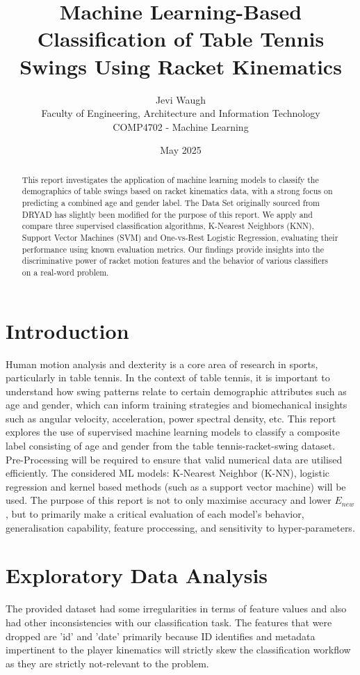 \documentclass[10pt,twocolumn]{article}
\title{\textbf{Machine Learning-Based Classification of Table Tennis Swings Using Racket Kinematics}}
\author{Jevi Waugh \\
Faculty of Engineering, Architecture and Information Technology \\
COMP4702 - Machine Learning}
\date{May 2025}
\begin{document}
\maketitle

\begin{abstract}
This report investigates the application of machine learning models to classify the demographics of table swings based on racket kinematics data, with a strong focus on predicting a combined age and gender label. The Data Set originally sourced from DRYAD has slightly been modified for the purpose of this report. We apply and compare three supervised classification algorithms, K-Nearest Neighbors (KNN), Support Vector Machines (SVM) and One-vs-Rest Logistic Regression, evaluating their performance using known evaluation metrics. Our findings provide insights into the discriminative power of racket motion features and the behavior of various classifiers on a real-word problem.
\end{abstract}

\section{Introduction}
Human motion analysis and dexterity is a core area of research in sports, particularly in table tennis. In the context of table tennis, it is important to understand how swing patterns relate to certain demographic attributes such as age and gender, which can inform training strategies and biomechanical insights such as angular velocity, acceleration, power spectral density, etc. This report explores the use of supervised machine learning models to classify a composite label consisting of age and gender from the table tennis-racket-swing dataset. Pre-Processing will be required to ensure that valid numerical data are utilised efficiently. The considered ML models: K-Nearest Neighbor (K-NN), logistic regression and kernel based methods (such as a support vector machine) will be used. The purpose of this report is not to only maximise accuracy and lower $E_{new}$, but to primarily make a critical evaluation of each model's behavior, generalisation capability, feature proccessing, and sensitivity to hyper-parameters.

\section{Exploratory Data Analysis}
The provided dataset had some irregularities in terms of feature values and also had other inconsistencies with our classification task. The features that were dropped are 'id' and 'date' primarily because ID identifies and metadata impertinent to the player kinematics will strictly skew the classification workflow as they are strictly not-relevant to the problem.
\end{document}
